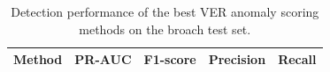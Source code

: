 \begin{table}[H]
\centering
\caption{Detection performance of the best VER anomaly scoring methods on the broach test set.}
\begin{tabular}{lcccc}
\hline
Method & PR-AUC & F1-score & Precision & Recall \\
\hline
\hline
\end{tabular}
\label{tab:broach_detection_performance}
\end{table}